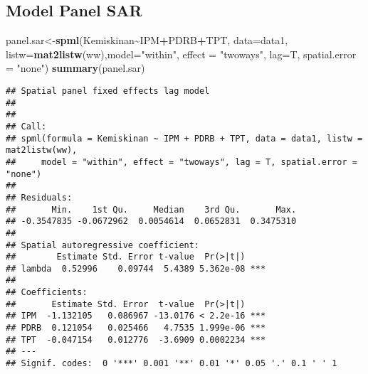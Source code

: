 \documentclass[
]{book}
\newenvironment{Shaded}{\begin{snugshade}}{\end{snugshade}}
\newcommand{\CommentTok}[1]{\textcolor[rgb]{0.56,0.35,0.01}{\textit{#1}}}
\newcommand{\DataTypeTok}[1]{\textcolor[rgb]{0.13,0.29,0.53}{#1}}
\newcommand{\DecValTok}[1]{\textcolor[rgb]{0.00,0.00,0.81}{#1}}
\newcommand{\KeywordTok}[1]{\textcolor[rgb]{0.13,0.29,0.53}{\textbf{#1}}}
\newcommand{\NormalTok}[1]{#1}
\newcommand{\OperatorTok}[1]{\textcolor[rgb]{0.81,0.36,0.00}{\textbf{#1}}}
\newcommand{\StringTok}[1]{\textcolor[rgb]{0.31,0.60,0.02}{#1}}
\begin{document}
\hypertarget{model-panel-sar}{%
\subsection{Model Panel SAR}\label{model-panel-sar}}

\begin{Shaded}
\begin{Highlighting}[]
\NormalTok{panel.sar\textless{}{-}}\KeywordTok{spml}\NormalTok{(Kemiskinan}\OperatorTok{\textasciitilde{}}\NormalTok{IPM}\OperatorTok{+}\NormalTok{PDRB}\OperatorTok{+}\NormalTok{TPT, }\DataTypeTok{data=}\NormalTok{data1, }\DataTypeTok{listw=}\KeywordTok{mat2listw}\NormalTok{(ww),}\DataTypeTok{model=}\StringTok{"within"}\NormalTok{, }
                \DataTypeTok{effect =} \StringTok{"twoways"}\NormalTok{, }\DataTypeTok{lag=}\NormalTok{T, }\DataTypeTok{spatial.error =} \StringTok{"none"}\NormalTok{)}
\KeywordTok{summary}\NormalTok{(panel.sar)}
\end{Highlighting}
\end{Shaded}

\begin{verbatim}
## Spatial panel fixed effects lag model
##  
## 
## Call:
## spml(formula = Kemiskinan ~ IPM + PDRB + TPT, data = data1, listw = mat2listw(ww), 
##     model = "within", effect = "twoways", lag = T, spatial.error = "none")
## 
## Residuals:
##       Min.    1st Qu.     Median    3rd Qu.       Max. 
## -0.3547835 -0.0672962  0.0054614  0.0652831  0.3475310 
## 
## Spatial autoregressive coefficient:
##        Estimate Std. Error t-value  Pr(>|t|)    
## lambda  0.52996    0.09744  5.4389 5.362e-08 ***
## 
## Coefficients:
##       Estimate Std. Error  t-value  Pr(>|t|)    
## IPM  -1.132105   0.086967 -13.0176 < 2.2e-16 ***
## PDRB  0.121054   0.025466   4.7535 1.999e-06 ***
## TPT  -0.047154   0.012776  -3.6909 0.0002234 ***
## ---
## Signif. codes:  0 '***' 0.001 '**' 0.01 '*' 0.05 '.' 0.1 ' ' 1
\end{verbatim}

\begin{Shaded}
\end{Shaded}
\end{document}
